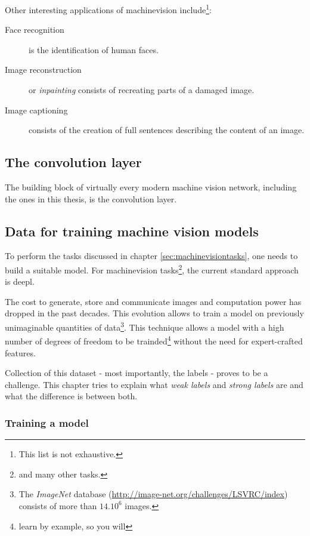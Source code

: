 Other interesting applications of \gls{machinevision} include\footnote{This list is not exhaustive.}:
\begin{description}
    \item[Face recognition] is the identification of human faces. 
    \item[Image reconstruction] or \textit{inpainting} consists of recreating parts of a damaged image.
    \item[Image captioning] consists of the creation of full sentences describing the content of an image.    
\end{description}

\subsection{The convolution layer}

The building block of virtually every modern machine vision network, including the ones in this thesis, is the convolution layer.


\subsection{Data for training machine vision models}

To perform the tasks discussed in chapter \ref{sec:machinevisiontasks}, one needs to build a suitable model.
For \Gls{machinevision} tasks\footnote{and many other tasks.}, the current standard approach is \Gls{deepl}.


The cost to generate, store and communicate images and computation power has dropped in the past decades.
This evolution allows to train a model  on previously unimaginable quantities of data\footnote{The \textit{ImageNet} database (\url{http://image-net.org/challenges/LSVRC/index}) consists of more than $14.10^6$ images.}.
This technique allows a model with a high number of degrees of freedom to be trainded\footnote{learn by example, so you will} without the need for expert-crafted features. 


Collection of this dataset - most importantly, the labels - proves to be a challenge. 
This chapter tries to explain what \textit{weak labels} and \textit{strong labels} are and what the difference is between both.

\subsubsection{Training a model}

